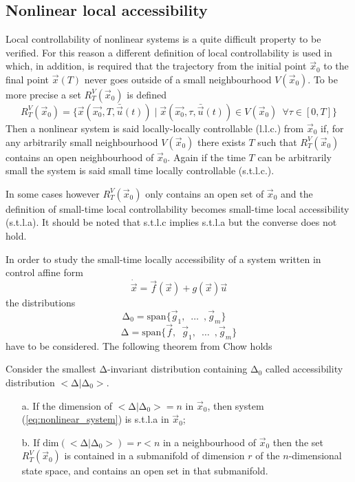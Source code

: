 \subsection{Nonlinear local accessibility}
Local controllability of nonlinear systems is a quite difficult property to be verified.
For this reason a different definition of local controllability is used in which,
in addition, is required that the trajectory from the initial point $\vec{x}_0$ to the
final point $\vec{x}(T)$ never goes outside of a small neighbourhood $V(\vec{x}_0)$.
To be more precise a set $R_{T}^{V}(\vec{x}_0)$ is defined
\[
R_{T}^{V}(\vec{x}_0) = \{\vec{x}(\vec{x_0}, T, \bar{\vec{u}}(t)) \mid
\vec{x}(\vec{x_0}, \tau, \bar{\vec{u}}(t)) \in V(\vec{x}_0) \enspace \forall \tau \in [0,T]\}
\]
Then a nonlinear system is said locally-locally controllable (l.l.c.) from $\vec{x}_0$ if,
for any arbitrarily small neighbourhood $V(\vec{x}_0)$ there exists $T$ such that
$R_{T}^{V}(\vec{x}_0)$ contains an open neighbourhood of $\vec{x}_0$.
Again if the time $T$ can be arbitrarily small the system is said
small time locally controllable (s.t.l.c.).
\par
In some cases however $R_{T}^{V}(\vec{x}_0)$ only contains an open set of $\vec{x}_0$
and the definition of small-time local controllability becomes small-time local accessibility
(s.t.l.a). It should be noted that s.t.l.c implies s.t.l.a but the converse does not hold.
\par
In order to study the small-time locally accessibility of a system written in control affine form
\begin{equation}\label{eq:nonlinear_system}
\dot{\vec{x}} = \vec{f}(\vec{x}) + g(\vec{x}) \vec{u}
\end{equation}
the distributions
\[
\mathrm{\Delta}_0 = \mathrm{span} \{\vec{g}_1, \enspace \hdots \enspace, \vec{g}_m\} \quad
\]
\[
\mathrm{\Delta} = \mathrm{span} \{\vec{f},\enspace\vec{g}_1, \enspace \hdots \enspace, \vec{g}_m\}
\]
have to be considered. The following theorem from Chow holds
\begin{theorem}
  Consider the smallest $\mathrm{\Delta}$-invariant distribution containing $\mathrm{\Delta}_0$ called
  accessibility distribution $<\mathrm{\Delta}|\mathrm{\Delta}_0>$.
  \begin{itemize}
  \item[a.]If the dimension of $<\mathrm{\Delta}|\mathrm{\Delta}_0>= n$ in $\vec{x}_0$, then system (\ref{eq:nonlinear_system})
    is s.t.l.a in $\vec{x}_{0}$;
  \item[b.]If $\mathrm{dim}(<\mathrm{\Delta}|\mathrm{\Delta}_0>)= r < n$ in a neighbourhood of $\vec{x}_0$
    then the set $R_{T}^{V}(\vec{x}_0)$ is contained in a submanifold of dimension $r$ of the
    $n$-dimensional state space, and contains an open set in that submanifold.
  \end{itemize}
\end{theorem}

